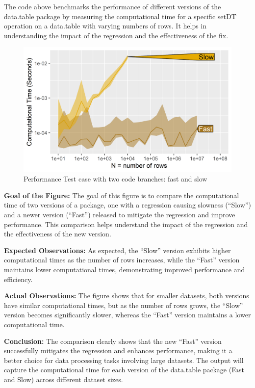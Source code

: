 \noindent The code above benchmarks the performance of different versions of the data.table package by measuring the computational time for a specific setDT operation on a data.table with varying numbers of rows. It helps in understanding the impact of the regression and the effectiveness of the fix. \\


\begin{figure}[H]
    \centering
    \includegraphics[width=0.6\linewidth]{figures/atime.list.5427.png}
    \caption{Performance Test case with two code branches: fast and slow}
    \label{fig:label3}
\end{figure}

\textbf{Goal of the Figure:} The goal of this figure is to compare the computational time of two versions of a package, one with a regression causing slowness (``Slow'') and a newer version (``Fast'') released to mitigate the regression and improve performance. This comparison helps understand the impact of the regression and the effectiveness of the new version.

\textbf{Expected Observations:} As expected, the ``Slow'' version exhibits higher computational times as the number of rows increases, while the ``Fast'' version maintains lower computational times, demonstrating improved performance and efficiency.

\textbf{Actual Observations:} The figure shows that for smaller datasets, both versions have similar computational times, but as the number of rows grows, the ``Slow'' version becomes significantly slower, whereas the ``Fast'' version maintains a lower computational time.

\textbf{Conclusion:} The comparison clearly shows that the new ``Fast'' version successfully mitigates the regression and enhances performance, making it a better choice for data processing tasks involving large datasets. The output will capture the computational time for each version of the data.table package (Fast and Slow) across different dataset sizes.
\vspace{0.1in}

